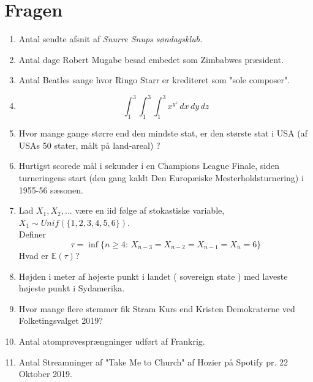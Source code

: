 \documentclass[10pt,a4paper]{article}
\begin{document}
\section*{Fragen}
\begin{enumerate}
  \item Antal sendte afsnit af \textit{Snurre Snups søndagsklub.}
  
 \item Antal dage Robert Mugabe besad embedet som Zimbabwes præsident.

  \item Antal Beatles sange hvor Ringo Starr er krediteret som "sole composer".

  \item 
  $$
  \int_{1}^{3}\int_{1}^{3}\int_{1}^{3} x^{y^z}\,dx\,dy\,dz
  $$ 
  
  \item Hvor mange gange større end den mindste stat, er den største stat i USA (af USAs 50 stater, målt på land-areal) ?
  
  \item Hurtigst scorede mål i sekunder i en Champions League Finale, siden turneringens start (den gang kaldt Den Europæiske Mesterholdsturnering) i 1955-56 sæsonen. 

\item Lad $X_1,X_2,...$ være en iid følge af stokastiske variable, $X_1 \sim Unif\left(\{1,2,3,4,5,6\}\right)$.\\
Definer 
$$
\tau = \inf\{n \geq 4: \, X_{n-3}=X_{n-2} = X_{n-1} = X_n = 6 \}
$$
Hvad er $\mathbb{E}(\tau)$?
\item Højden i meter af højeste punkt i landet ( sovereign state ) med laveste højeste punkt i Sydamerika. 


\item Hvor mange flere stemmer fik Stram Kurs end Kristen Demokraterne ved Folketingsvalget 2019?

\item Antal atomprøvesprængninger udført af Frankrig. 

\item Antal Streamninger af "Take Me to Church"	af Hozier på Spotify pr. 22 Oktober 2019.



\end{enumerate}
\end{document}

